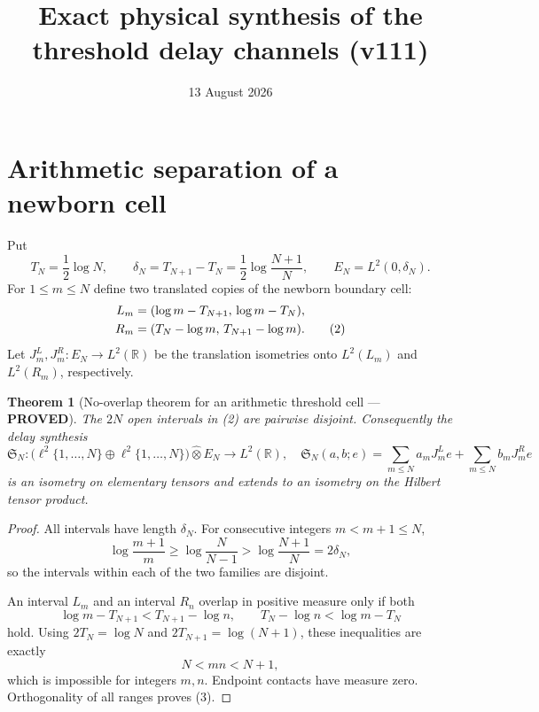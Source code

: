 \documentclass[11pt]{article}
\title{Exact physical synthesis of the threshold delay channels (v111)}
\date{13 August 2026}
\newcommand{\PROVED}{\textcolor{green!40!black}{\textbf{PROVED}}}
\newtheorem{theorem}{Theorem}
\begin{document}
\maketitle

\section{Arithmetic separation of a newborn cell}

Put
\begin{equation}
 T_N=\frac12\log N,
 \qquad
 \delta_N=T_{N+1}-T_N=\frac12\log\frac{N+1}{N},
 \qquad E_N=L^2(0,\delta_N).                                  \tag{1}
\end{equation}
For $1\le m\le N$ define two translated copies of the newborn boundary
cell:
\begin{align}
 L_m&=(\log m-T_{N+1},\,\log m-T_N),\notag\\
 R_m&=(T_N-\log m,\,T_{N+1}-\log m).                          \tag{2}
\end{align}
Let $J_m^L,J_m^R:E_N\to L^2(\mathbb R)$ be the translation isometries onto
$L^2(L_m)$ and $L^2(R_m)$, respectively.

\begin{theorem}[No-overlap theorem for an arithmetic threshold cell ---
\PROVED]
The $2N$ open intervals in (2) are pairwise disjoint.  Consequently the
delay synthesis
\begin{equation}
 \mathfrak S_N:
 \bigl(\ell^2\{1,\ldots,N\}\oplus\ell^2\{1,\ldots,N\}\bigr)
       \widehat\otimes E_N\longrightarrow L^2(\mathbb R),
\quad
 \mathfrak S_N(a,b;e)=
 \sum_{m\le N}a_mJ_m^Le+\sum_{m\le N}b_mJ_m^Re               \tag{3}
\end{equation}
is an isometry on elementary tensors and extends to an isometry on the
Hilbert tensor product.
\end{theorem}

\begin{proof}
All intervals have length $\delta_N$.  For consecutive integers
$m<m+1\le N$,
\[
 \log\frac{m+1}{m}\ge\log\frac N{N-1}
 >\log\frac{N+1}{N}=2\delta_N,
\]
so the intervals within each of the two families are disjoint.

An interval $L_m$ and an interval $R_n$ overlap in positive measure only
if both
\[
 \log m-T_{N+1}<T_{N+1}-\log n,
 \qquad
 T_N-\log n<\log m-T_N
\]
hold.  Using $2T_N=\log N$ and $2T_{N+1}=\log(N+1)$, these inequalities
are exactly
\[
                             N<mn<N+1,
\]
which is impossible for integers $m,n$.  Endpoint contacts have measure
zero.  Orthogonality of all ranges proves (3).
\end{proof}
\end{document}
